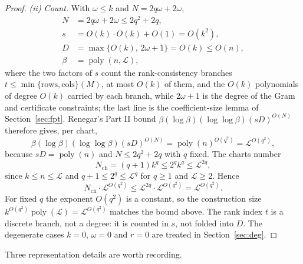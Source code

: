 \documentclass[journal]{IEEEtran}
\theoremstyle{plainn}
\theoremstyle{remark}
\begin{document}
\begin{proof}
\emph{(ii) Count.} With $\omega\le k$ and $N=2q\omega+2\omega$,
\begin{align}
N &= 2q\omega+2\omega\le 2q^2+2q,\\
s &= O(k)\cdot O(k)+O(1)=O(k^2),\\
D &= \max\{O(k),\,2\omega+1\}=O(k)\le O(n),\\
\beta &= \operatorname{poly}(n,\mathcal L),
\end{align}
where the two factors of $s$ count the rank-consistency branches
$t\le\min\{\text{rows},\text{cols}\}(M)$, at most $O(k)$ of them, and the
$O(k)$ polynomials of degree $O(k)$ carried by each branch, while $2\omega+1$
is the degree of the Gram and certificate constraints; the last line is the
coefficient-size lemma of Section~\ref{sec:fpt}. Renegar's Part II bound
$\beta(\log\beta)(\log\log\beta)(sD)^{O(N)}$ therefore gives, per chart,
\begin{equation*}
\beta(\log \beta)(\log\log \beta)(sD)^{O(N)}
=\operatorname{poly}(n)^{O(q^2)}
=\mathcal L^{O(q^2)},
\end{equation*}
because $sD=\operatorname{poly}(n)$ and $N\le 2q^2+2q$ with $q$ fixed. The
charts number
\begin{equation*}
N_{\mathrm{ch}}=(q+1)k^{q}\le 2^{q}k^{q}\le\mathcal L^{2q},
\end{equation*}
since $k\le n\le\mathcal L$ and $q+1\le 2^{q}\le\mathcal L^{q}$ for $q\ge1$
and $\mathcal L\ge2$. Hence
\begin{equation*}
N_{\mathrm{ch}}\cdot\mathcal L^{O(q^2)}
\le\mathcal L^{2q}\cdot\mathcal L^{O(q^2)}
=\mathcal L^{O(q^2)} .
\end{equation*}
For fixed $q$ the exponent $O(q^2)$ is a constant, so the construction size
$k^{O(q^2)}\operatorname{poly}(\mathcal L)=\mathcal L^{O(q^2)}$ matches the bound above. The rank index $t$ is a discrete branch, not a
degree: it is counted in $s$, not folded into $D$. The degenerate cases $k=0$,
$\omega=0$ and $r=0$ are treated in Section~\ref{sec:deg}.
\end{proof}



Three representation details are worth recording.
\end{document}
